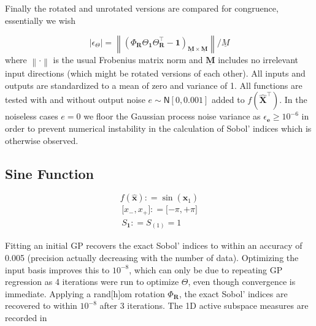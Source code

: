 \documentclass[preprint,12pt]{elsarticle}
\newcommand*{\M}[1]{\ensuremath{#1}\xspace}
\newcommand*{\vr}[1]{\M{\mathbf{#1}}}
\newcommand*{\deq}{\M{\mathrel{\mathop:}=}}
\newcommand*{\gauss}[2]{\mathsf{N}\!\left\lbrack{} #1 , #2 \right\rbrack}
\newcommand*{\modulus}[1]{\M{\left\lvert#1\right\rvert}}
\newcommand*{\norm}[1]{\M{\left\lVert#1\right\rVert}}
\begin{document}
        Finally the rotated and unrotated versions are compared for congruence, essentially we wish


        \begin{equation}
            \modulus{\epsilon_{\Theta}} = \norm{\left(\Phi_{\vr{R}} \Theta_{\vr{1}} \Theta_{\vr{R}}^{\intercal} - \vr{1}\right)_{\underline{\vr{M}}\times\underline{\vr{M}}}} / \underline{M}
        \end{equation}
        where \M{\norm{\cdot}} is the usual Frobenius matrix norm and \M{\underline{\vr{M}}} includes no irrelevant input directions (which might be rotated versions of each other). 
        All inputs and outputs are standardized to a mean of zero and variance of 1. All functions are tested with and without output noise \M{e \sim \gauss{0}{0.001}} added to \M{f(\vr{\hat{X}}^{\intercal})}. 
        In the noiseless cases \M{e=0} we floor the Gaussian process noise variance as \M{\epsilon_\vr{e} \geq 10^{-6}} in order to prevent numerical instability in the calculation of Sobol' indices which is otherwise observed.

        \subsection{Sine Function} \label{sub:Results:Sin}
            \begin{equation} \label{def:Sin}
                f(\vr{\hat{x}}) \deq \sin(\vr{\hat{x}}_1)
            \end{equation}
            \begin{gather*}
                \lbrack x_-, x_+ \rbrack \deq \lbrack -\pi, +\pi \rbrack \\
                S_{\vr{1}} \deq S_{(1)} = 1
            \end{gather*}



            Fitting an initial GP recovers the exact Sobol' indices to within an accuracy of 0.005 (precision actually decreasing with the number of data). Optimizing the input basis improves this to $10^{-8}$, which can only be due to repeating GP regression as 4 iterations were run to optimize $\Theta$, even though convergence is immediate.
            Applying a rand[h]om rotation \M{\Phi_{\vr{R}}}, the exact Sobol' indices are recovered to within $10^{-8}$ after 3 iterations. The 1D active subspace measures are recorded in 
\end{document}
